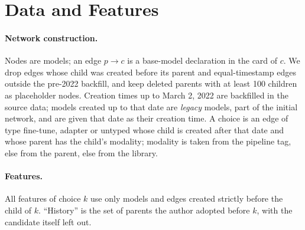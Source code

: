 \section{Data and Features}
\label{app:data}

\paragraph{Network construction.}
Nodes are models; an edge $p \to c$ is a base-model declaration in the card of $c$. We drop edges whose child was
created before its parent and equal-timestamp edges outside the pre-2022 backfill, and keep deleted parents with at
least 100 children as placeholder nodes. Creation times up to March 2, 2022 are backfilled in the source data; models
created up to that date are \emph{legacy} models, part of the initial network, and are given that date as their
creation time. A choice is an edge of type fine-tune, adapter or untyped whose child is created after that date and
whose parent has the child's modality; modality is taken from the pipeline tag, else from the parent, else from the
library.

\paragraph{Features.}
All features of choice $k$ use only models and edges created strictly before the child of $k$. ``History'' is the
set of parents the author adopted before $k$, with the candidate itself left out.

